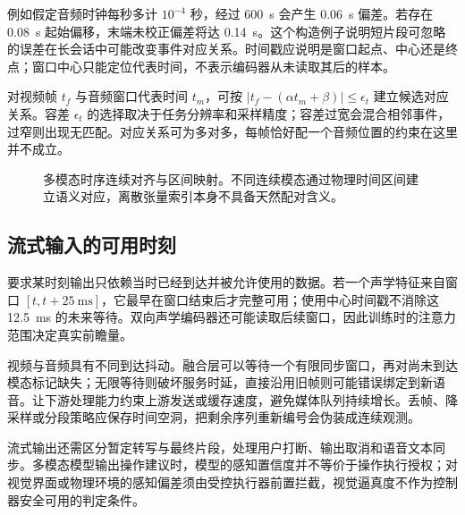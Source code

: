 \documentclass[../textbook.tex]{subfiles}
\begin{document}
例如假定音频时钟每秒多计 $10^{-4}$ 秒，经过 \qty{600}{\second} 会产生 \qty{0.06}{\second} 偏差。若存在 \qty{0.08}{\second} 起始偏移，末端未校正偏差将达 \qty{0.14}{\second}。这个构造例子说明短片段可忽略的误差在长会话中可能改变事件对应关系。时间戳应说明是窗口起点、中心还是终点；窗口中心只能定位代表时间，不表示编码器从未读取其后的样本。

对视频帧 $t_f$ 与音频窗口代表时间 $t_m$，可按 $|t_f-(\alpha t_m+\beta)|\le\epsilon_t$ 建立候选对应关系。容差 $\epsilon_t$ 的选择取决于任务分辨率和采样精度；容差过宽会混合相邻事件，过窄则出现无匹配。对应关系可为多对多，每帧恰好配一个音频位置的约束在这里并不成立。

\begin{figure}[htbp]
\centering
{}
\caption[多模态时序连续对齐与区间映射]{多模态时序连续对齐与区间映射。不同连续模态通过物理时间区间建立语义对应，离散张量索引本身不具备天然配对含义。}\label{fig:mm-time}
\end{figure}

\subsection{流式输入的可用时刻}
要求某时刻输出只依赖当时已经到达并被允许使用的数据。若一个声学特征来自窗口 $[t,t+\qty{25}{\milli\second}]$，它最早在窗口结束后才完整可用；使用中心时间戳不消除这 \qty{12.5}{\milli\second} 的未来等待。双向声学编码器还可能读取后续窗口，因此训练时的注意力范围决定真实前瞻量。

视频与音频具有不同到达抖动。融合层可以等待一个有限同步窗口，再对尚未到达模态标记缺失；无限等待则破坏服务时延，直接沿用旧帧则可能错误绑定到新语音。让下游处理能力约束上游发送或缓存速度，避免媒体队列持续增长。丢帧、降采样或分段策略应保存时间空洞，把剩余序列重新编号会伪装成连续观测。

流式输出还需区分暂定转写与最终片段，处理用户打断、输出取消和语音文本同步。多模态模型输出操作建议时，模型的感知置信度并不等价于操作执行授权；对视觉界面或物理环境的感知偏差须由受控执行器前置拦截，视觉逼真度不作为控制器安全可用的判定条件。
\end{document}
